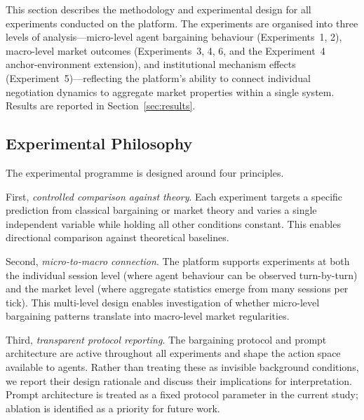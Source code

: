 
\label{sec:experiments}

This section describes the methodology and experimental design for all experiments conducted on the platform.  The experiments are organised into three levels of analysis---micro-level agent bargaining behaviour (Experiments~1, 2), macro-level market outcomes (Experiments~3, 4, 6, and the Experiment~4 anchor-environment extension), and institutional mechanism effects (Experiment~5)---reflecting the platform's ability to connect individual negotiation dynamics to aggregate market properties within a single system.  Results are reported in Section~\ref{sec:results}.

\subsection{Experimental Philosophy}
\label{sec:exp-philosophy}

The experimental programme is designed around four principles.

First, \emph{controlled comparison against theory}.  Each experiment targets a specific prediction from classical bargaining or market theory and varies a single independent variable while holding all other conditions constant.  This enables directional comparison against theoretical baselines.

Second, \emph{micro-to-macro connection}.  The platform supports experiments at both the individual session level (where agent behaviour can be observed turn-by-turn) and the market level (where aggregate statistics emerge from many sessions per tick).  This multi-level design enables investigation of whether micro-level bargaining patterns translate into macro-level market regularities.

Third, \emph{transparent protocol reporting}.  The bargaining protocol and prompt architecture are active throughout all experiments and shape the action space available to agents.  Rather than treating these as invisible background conditions, we report their design rationale and discuss their implications for interpretation.  Prompt architecture is treated as a fixed protocol parameter in the current study; ablation is identified as a priority for future work.

